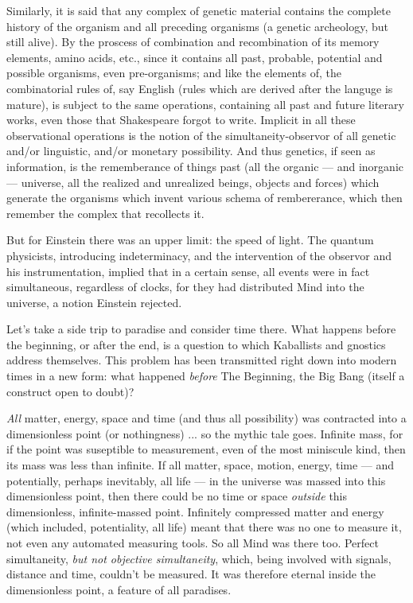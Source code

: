 Similarly, it is said that any complex of
genetic material contains the complete history of the organism and all preceding organisms (a genetic archeology, but still
alive). By the proscess of combination and
recombination of its memory elements, amino
acids, etc., since it contains all past, probable, potential and possible organisms, even
pre-organisms; and like the elements of, the
combinatorial rules of, say English (rules
which are derived after the languge is mature), is subject to the same operations, containing all past and future literary works,
even those that Shakespeare forgot to write.
Implicit in all these observational operations
is the notion of the simultaneity-observor of
all genetic and\slash or linguistic, and\slash or monetary
possibility. And thus genetics, if seen as
information, is the rememberance of things
past (all the organic --- and inorganic --- universe, all the realized and unrealized beings,
objects and forces) which generate the organisms which invent various schema of
rembererance, which then remember the complex that recollects it.

But for Einstein there was an upper limit:
the speed of light. The quantum physicists,
introducing indeterminacy, and the intervention of the observor and his instrumentation,
implied that in a certain sense, all
events were in fact simultaneous, regardless
of clocks, for they had distributed Mind into
the universe, a notion Einstein rejected.

Let's take a side trip to paradise and consider time there. What happens before the
beginning, or after the end, is a question to
which Kaballists and gnostics address themselves. This problem has been transmitted
right down into modern times in a new form:
what happened \emph{before} The Beginning, the
Big Bang (itself a construct open to doubt)?

\emph{All} matter, energy, space and time (and
thus all possibility) was contracted into a
dimensionless point (or nothingness) ... so
the mythic tale goes. Infinite mass, for if the
point was suseptible to measurement,
even of the most miniscule kind, then its mass
was less than infinite. If all matter, space,
motion, energy, time --- and potentially, perhaps inevitably, all life --- in the universe was
massed into this dimensionless point, then
there could be no time or space \emph{outside} this
dimensionless, infinite-massed point. Infinitely compressed matter and energy (which
included, potentiality, all life) meant that
there was no one to measure it, not even any
automated measuring tools. So all Mind was
there too. Perfect simultaneity, \emph{but not objective simultaneity}, which, being involved
with signals, distance and time, couldn't be
measured. It was therefore eternal inside the
dimensionless point, a feature of all paradises.

